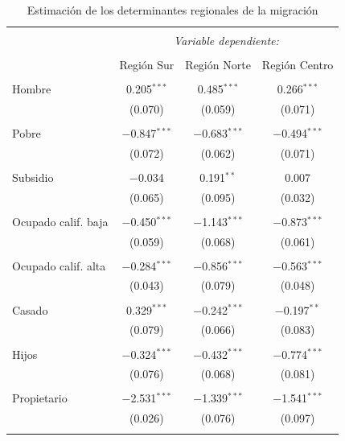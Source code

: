 \documentclass[12pt,a4paper]{article}
\begin{document}
\begin{table}[!htbp] \centering \footnotesize 
  \caption{\\Estimación de los determinantes regionales de la migración} 
  \label{cuadro:estimacion_regional} 
\begin{tabular}{@{\extracolsep{5pt}}lccc} 
\\[-1.8ex]\hline 
\hline \\[-1.8ex] 
 & \multicolumn{3}{c}{\textit{Variable dependiente:}} \\ 
\cline{2-4} 
\\[-1.8ex] & Región Sur & Región Norte & Región Centro \\ 
\hline \\[-1.8ex] 
 Hombre & 0.205$^{***}$ & 0.485$^{***}$ & 0.266$^{***}$ \\ 
  & (0.070) & (0.059) & (0.071) \\ 
  & & & \\ 
 Pobre & $-$0.847$^{***}$ & $-$0.683$^{***}$ & $-$0.494$^{***}$ \\ 
  & (0.072) & (0.062) & (0.071) \\ 
  & & & \\ 
 Subsidio & $-$0.034 & 0.191$^{**}$ & 0.007 \\ 
  & (0.065) & (0.095) & (0.032) \\ 
  & & & \\ 
 Ocupado calif. baja & $-$0.450$^{***}$ & $-$1.143$^{***}$ & $-$0.873$^{***}$ \\ 
  & (0.059) & (0.068) & (0.061) \\ 
  & & & \\ 
 Ocupado calif. alta & $-$0.284$^{***}$ & $-$0.856$^{***}$ & $-$0.563$^{***}$ \\ 
  & (0.043) & (0.079) & (0.048) \\ 
  & & & \\ 
 Casado & 0.329$^{***}$ & $-$0.242$^{***}$ & $-$0.197$^{**}$ \\ 
  & (0.079) & (0.066) & (0.083) \\ 
  & & & \\ 
 Hijos & $-$0.324$^{***}$ & $-$0.432$^{***}$ & $-$0.774$^{***}$ \\ 
  & (0.076) & (0.068) & (0.081) \\ 
  & & & \\ 
 Propietario & $-$2.531$^{***}$ & $-$1.339$^{***}$ & $-$1.541$^{***}$ \\ 
  & (0.026) & (0.076) & (0.097) \\ 
  & & & \\ 

\end{tabular}
\end{table}
\end{document}
